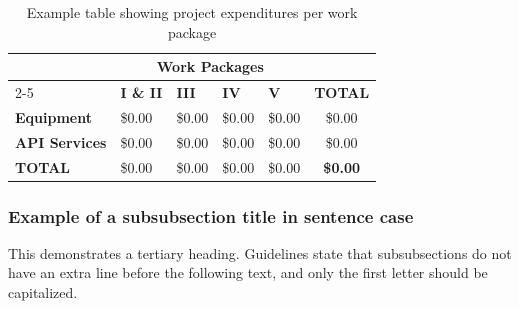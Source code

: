 \begin{table}[H]
\centering
\caption{Example table showing project expenditures per work package}
\label{tab:example_expenditures}
\begin{tabularx}{\textwidth}{|l|X|X|X|X|c|}
\hline
\multicolumn{1}{|c|}{} & \multicolumn{4}{c|}{\textbf{Work Packages}} & \textbf{} \\ \cline{2-5}
\multicolumn{1}{|c|}{} & \centering\textbf{I \& II} & \centering\textbf{III} & \centering\textbf{IV} & \centering\textbf{V} & \textbf{TOTAL} \\ \hline
\textbf{Equipment} & \$0.00 & \$0.00 & \$0.00 & \$0.00 & \$0.00 \\ \hline
\textbf{API Services} & \$0.00 & \$0.00 & \$0.00 & \$0.00 & \$0.00 \\ \hline
\textbf{TOTAL} & \$0.00 & \$0.00 & \$0.00 & \$0.00 & \textbf{\$0.00} \\ \hline
\end{tabularx}
\end{table}

\subsubsection{Example of a subsubsection title in sentence case}
This demonstrates a tertiary heading. Guidelines state that subsubsections do not have an extra line before the following text, and only the first letter should be capitalized.
